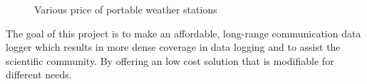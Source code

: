 \begin{figure}[H]
  \centering
  \quad
  \quad
  \quad
  \caption{Various price of portable weather stations}
  \label{fig:1}
\end{figure}

The goal of this project is to make an affordable, long-range communication data logger which results in more dense coverage in data logging and to assist the scientific community. By offering an low cost solution that is modifiable for different needs.